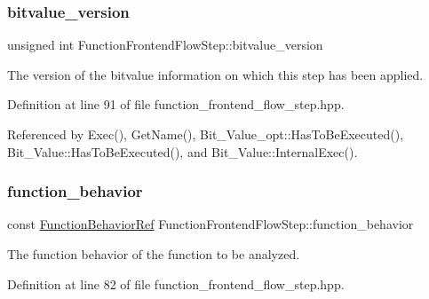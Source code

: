 \subsubsection{\texorpdfstring{bitvalue\+\_\+version}{bitvalue\_version}}
{\footnotesize\ttfamily unsigned int Function\+Frontend\+Flow\+Step\+::bitvalue\+\_\+version\hspace{0.3cm}{\ttfamily [protected]}}



The version of the bitvalue information on which this step has been applied. 



Definition at line 91 of file function\+\_\+frontend\+\_\+flow\+\_\+step.\+hpp.



Referenced by Exec(), Get\+Name(), Bit\+\_\+\+Value\+\_\+opt\+::\+Has\+To\+Be\+Executed(), Bit\+\_\+\+Value\+::\+Has\+To\+Be\+Executed(), and Bit\+\_\+\+Value\+::\+Internal\+Exec().

\mbox{\label{classFunctionFrontendFlowStep_a3690e91c0424f03e4aa589f04ee53aa7}} 
\subsubsection{\texorpdfstring{function\+\_\+behavior}{function\_behavior}}
{\footnotesize\ttfamily const \hyperlink{function__behavior_8hpp_affbc6a46ab86ddfabe31c10986d333dc}{Function\+Behavior\+Ref} Function\+Frontend\+Flow\+Step\+::function\+\_\+behavior\hspace{0.3cm}{\ttfamily [protected]}}



The function behavior of the function to be analyzed. 



Definition at line 82 of file function\+\_\+frontend\+\_\+flow\+\_\+step.\+hpp.



